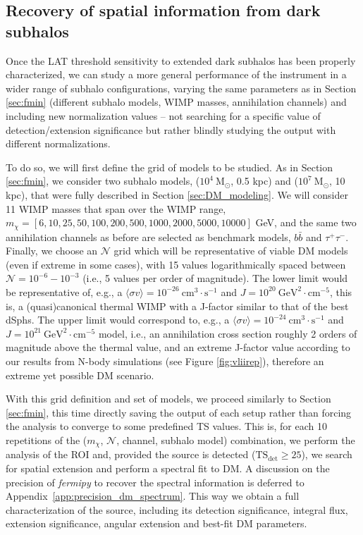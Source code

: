 \documentclass[%
 reprint,
nofootinbib,
 amsmath,amssymb,
 aps,
]{revtex4-2}
\begin{document}
\subsection{Recovery of spatial information from dark subhalos}
\label{sec:LAT_analysis}

Once the LAT threshold sensitivity to extended dark subhalos has been properly characterized, we can study a more general performance of the instrument in a wider range of subhalo configurations, varying the same parameters as in Section \ref{sec:fmin} (different subhalo models, WIMP masses, annihilation channels) and including new normalization values -- not searching for a specific value of detection/extension significance but rather blindly studying the output with different normalizations.

To do so, we will first define the grid of models to be studied. As in Section \ref{sec:fmin}, we consider two subhalo models, ($\mathrm{10^4~M_{\odot}}$, 0.5 kpc) and ($\mathrm{10^7~M_{\odot}}$, 10 kpc), that were fully described in Section \ref{sec:DM_modeling}. We will consider 11 WIMP masses that span over the WIMP range, $m_\chi=\left[6, 10, 25, 50, 100, 200, 500, 1000, 2000, 5000, 10000\right]$ GeV, and the same two annihilation channels as before are selected as benchmark models, $b\bar{b}$ and $\tau^+\tau^-$. Finally, we choose an $\mathcal{N}$ grid which will be representative of viable DM models (even if extreme in some cases), with 15 values logarithmically spaced between $\mathcal{N}=10^{-6}-10^{-3}$ (i.e., 5 values per order of magnitude). The lower limit would be representative of, e.g., a $\langle\sigma v\rangle=10^{-26}~\mathrm{cm^3\cdot s^{-1}}$ and $J=10^{20}~\mathrm{GeV^2\cdot cm^{-5}}$, this is, a (quasi)canonical thermal WIMP with a J-factor similar to that of the best dSphs. The upper limit would correspond to, e.g., a $\langle\sigma v\rangle=10^{-24}~\mathrm{cm^3\cdot s^{-1}}$ and $J=10^{21}~\mathrm{GeV^2\cdot cm^{-5}}$ model, i.e., an annihilation cross section roughly 2 orders of magnitude above the thermal value, and an extreme J-factor value according to our results from N-body simulations (see Figure \ref{fig:vliirep}), therefore an extreme yet possible DM scenario.

With this grid definition and set of models, we  proceed similarly to Section \ref{sec:fmin}, this time directly saving the output of each setup rather than forcing the analysis to converge to some predefined TS values. This is, for each 10 repetitions of the ($m_\chi$, $\mathcal{N}$, channel, subhalo model) combination, we perform the analysis of the ROI and, provided the source is detected ($\mathrm{TS_{det}\geq25}$), we search for spatial extension and perform a spectral fit to DM. A discussion on the precision of \textit{fermipy} to recover the spectral information is deferred to Appendix~\ref{app:precision_dm_spectrum}. This way we obtain a full characterization of the source, including its detection significance, integral flux, extension significance, angular extension and best-fit DM parameters.
\end{document}
